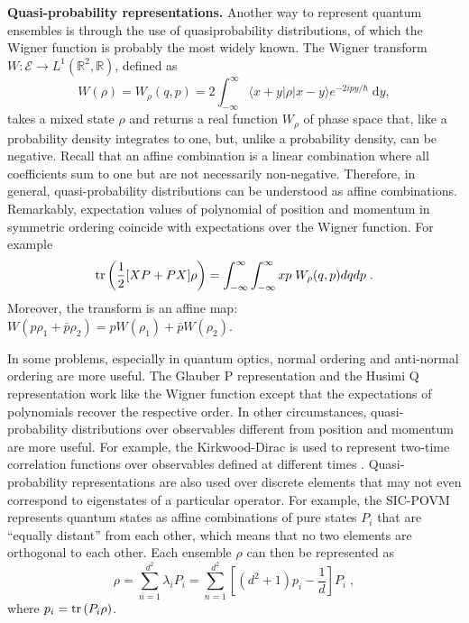 \documentclass[10pt,twocolumn, nofootinbib]{revtex4-2}
\newcommand{\Ens}[1][E] {\mathcal{#1}} %
\begin{document}

\textbf{Quasi-probability representations.} Another way to represent quantum ensembles is through the use of quasiprobability distributions, of which the Wigner function is probably the most widely known. The Wigner transform $W : \Ens \to L^1(\mathbb{R}^2, \mathbb{R}) $, defined as \cite[eq.~11.8-3a]{mandel1995}
\begin{equation}
	W(\rho) = W_{\rho} (q, p) = 2 \int_{-\infty}^{\infty} \langle x + y | \rho | x - y \rangle e^{-2 i p y / \hbar} \; \mathrm dy,
\end{equation}
takes a mixed state $\rho$ and returns a real function $W_{\rho}$ of phase space that, like a probability density integrates to one, but, unlike a probability density, can be negative. Recall that an affine combination is a linear combination where all coefficients sum to one but are not necessarily non-negative. Therefore, in general, quasi-probability distributions can be understood as affine combinations. Remarkably, expectation values of polynomial of position and momentum in symmetric ordering coincide with expectations over the Wigner function. For example
\begin{equation}
	\operatorname{tr} \left( \frac{1}{2}[XP+PX] \rho \right) = \int_{-\infty}^{\infty} \int_{-\infty}^{\infty} xp \; W_{\rho} (q, p) dq dp \; .
\end{equation}
Moreover, the transform is an affine map: $W(p \rho_1 + \bar{p} \rho_2 ) = p W(\rho_1) + \bar{p} W(\rho_2)$.

In some problems, especially in quantum optics, normal ordering and anti-normal ordering are more useful. The Glauber P representation and the Husimi Q representation work like the Wigner function except that the expectations of polynomials recover the respective order. In other circumstances, quasi-probability distributions over observables different from position and momentum are more useful. For example, the Kirkwood-Dirac is used to represent two-time correlation functions over observables defined at different times \cite{lostaglio2023}. Quasi-probability representations are also used over discrete elements that may not even correspond to eigenstates of a particular operator. For example, the SIC-POVM represents quantum states as affine combinations of pure states $P_i$ that are ``equally distant'' from each other, which means that no two elements are orthogonal to each other. Each ensemble $\rho$ can then be represented as \cite[eqs. 28-29]{fuchs2004}
\begin{equation}
	\rho = \sum_{n=1}^{d^2} \lambda_i P_i = \sum_{n=1}^{d^2} \left[ (d^2 + 1) p_i - \frac{1}{d} \right] P_i \; ,
\end{equation}
where $p_i = \operatorname{tr} \left(P_i \rho\right)$.
\end{document}
